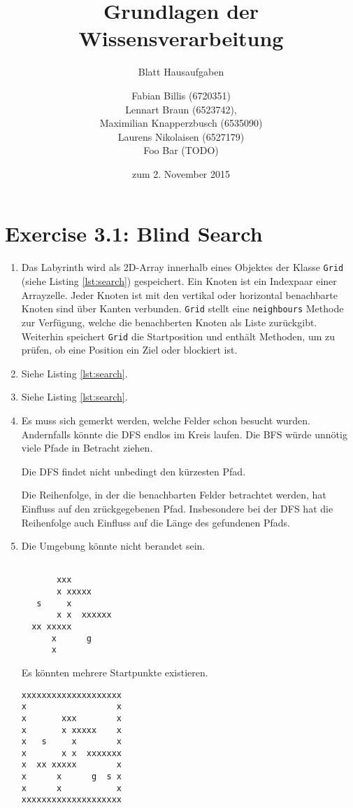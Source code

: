 \documentclass[a4paper]{scrartcl}
\title{Grundlagen der Wissensverarbeitung}
\subtitle{Blatt {\blattnr} Hausaufgaben}
\author{
    Fabian Billis (6720351) \\
    Lennart Braun (6523742), \\
    Maximilian Knapperzbusch (6535090) \\
    Laurens Nikolaisen (6527179) \\
    Foo Bar (TODO)
}
\date{zum 2. November 2015}
\def \blattnr {3}
\begin{document}
\maketitle

\section*{Exercise \blattnr.1: Blind Search}
\begin{enumerate}
    \item
        Das Labyrinth wird als 2D-Array innerhalb eines Objektes der Klasse
        \texttt{Grid} (siehe Listing \ref{lst:search}) gespeichert.  Ein Knoten
        ist ein Indexpaar einer Arrayzelle.  Jeder Knoten ist mit den vertikal
        oder horizontal benachbarte Knoten sind über Kanten verbunden.
        \texttt{Grid} stellt eine \texttt{neighbours} Methode zur Verfügung,
        welche die benachberten Knoten als Liste zurückgibt.  Weiterhin
        speichert \texttt{Grid} die Startposition und enthält Methoden, um zu
        prüfen, ob eine Position ein Ziel oder blockiert ist.

    \item
        Siehe Listing \ref{lst:search}.

    \item
        Siehe Listing \ref{lst:search}.

    \item
        Es muss sich gemerkt werden, welche Felder schon besucht wurden.
        Andernfalls könnte die DFS endlos im Kreis laufen. Die BFS würde
        unnötig viele Pfade in Betracht ziehen.

        Die DFS findet nicht unbedingt den kürzesten Pfad.

        Die Reihenfolge, in der die benachbarten Felder betrachtet werden, hat
        Einfluss auf den zrückgegebenen Pfad. Insbesondere bei der DFS hat
        die Reihenfolge auch Einfluss auf die Länge des gefundenen Pfads.

        \clearpage
    \item
        Die Umgebung könnte nicht berandet sein.
        \begin{verbatim}
                  
       xxx        
       x xxxxx    
   s     x        
       x x  xxxxxx
  xx xxxxx        
      x      g    
      x           
        \end{verbatim}
        Es könnten mehrere Startpunkte existieren.
        \begin{verbatim}
xxxxxxxxxxxxxxxxxxxx
x                  x
x       xxx        x
x       x xxxxx    x
x   s     x        x
x       x x  xxxxxxx
x  xx xxxxx        x
x      x      g  s x
x      x           x
xxxxxxxxxxxxxxxxxxxx
        \end{verbatim}


\end{enumerate}
\end{document}
